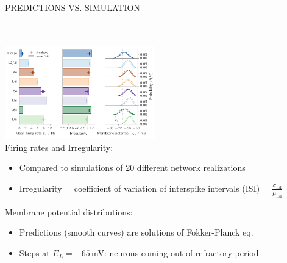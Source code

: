\documentclass[portrait, final, a0paper, fontscale=0.34, leqno]{baposter}
\begin{document}
\begin{poster}
{\begin{minipage}{0.98\linewidth}
    \vspace{0.3cm}
    \centerline{\uppercase{Predictions vs. simulation}}
    \begin{multicols}{2}
        ~\\~\\
        \includegraphics[height=4.0cm]{results}  
        \columnbreak \\
        Firing rates and Irregularity:
        \vspace{-\topsep}
        \begin{itemize}
            \setlength\itemsep{0.01cm}
            \item Compared to simulations of 20 different network realizations
            \item Irregularity = 
                coefficient of variation of interspike intervals (ISI) = 
            $\frac{\sigma_\text{ISI}}{\mu_\text{ISI}}$
        \end{itemize}
        Membrane potential distributions:
        \vspace{-\topsep}
        \begin{itemize}
            \setlength\itemsep{0.01cm}
            \item Predictions (smooth curves) are solutions of 
                Fokker-Planck eq.
            \item Steps at $E_L = -65$\,mV: neurons coming out of refractory period
        \end{itemize}
    \end{multicols}
        

\end{minipage}}
\end{poster}
\end{document}
